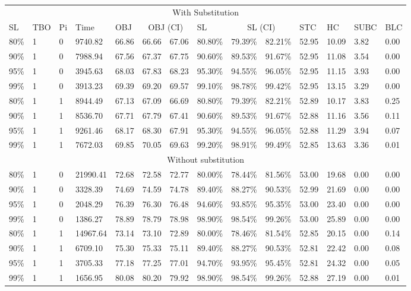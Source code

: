 \documentclass[10pt]{article}
\begin{document}
\begin{table}[]
\begin{tabular}{llllllllllllll}
\multicolumn{14}{c}{With Substitution} \\
SL & TBO & Pi & Time & OBJ & \multicolumn{2}{c}{OBJ (CI)} & SL & \multicolumn{2}{c}{SL (CI)} & STC & HC & SUBC & BLC \\
80\% & 1 & 0 & 9740.82 & 66.86 & 66.66 & 67.06 & 80.80\% & 79.39\% & 82.21\% & 52.95 & 10.09 & 3.82 & 0.00 \\
90\% & 1 & 0 & 7988.94 & 67.56 & 67.37 & 67.75 & 90.60\% & 89.53\% & 91.67\% & 52.95 & 11.08 & 3.54 & 0.00 \\
95\% & 1 & 0 & 3945.63 & 68.03 & 67.83 & 68.23 & 95.30\% & 94.55\% & 96.05\% & 52.95 & 11.15 & 3.93 & 0.00 \\
99\% & 1 & 0 & 3913.23 & 69.39 & 69.20 & 69.57 & 99.10\% & 98.78\% & 99.42\% & 52.95 & 13.15 & 3.29 & 0.00 \\
80\% & 1 & 1 & 8944.49 & 67.13 & 67.09 & 66.69 & 80.80\% & 79.39\% & 82.21\% & 52.89 & 10.17 & 3.83 & 0.25 \\
90\% & 1 & 1 & 8536.70 & 67.71 & 67.79 & 67.41 & 90.60\% & 89.53\% & 91.67\% & 52.88 & 11.16 & 3.56 & 0.11 \\
95\% & 1 & 1 & 9261.46 & 68.17 & 68.30 & 67.91 & 95.30\% & 94.55\% & 96.05\% & 52.88 & 11.29 & 3.94 & 0.07 \\
99\% & 1 & 1 & 7672.03 & 69.85 & 70.05 & 69.63 & 99.20\% & 98.91\% & 99.49\% & 52.85 & 13.63 & 3.36 & 0.01 \\
\multicolumn{14}{c}{Without substitution} \\
80\% & 1 & 0 & 21990.41 & 72.68 & 72.58 & 72.77 & 80.00\% & 78.44\% & 81.56\% & 53.00 & 19.68 & 0.00 & 0.00 \\
90\% & 1 & 0 & 3328.39 & 74.69 & 74.59 & 74.78 & 89.40\% & 88.27\% & 90.53\% & 52.99 & 21.69 & 0.00 & 0.00 \\
95\% & 1 & 0 & 2048.29 & 76.39 & 76.30 & 76.48 & 94.60\% & 93.85\% & 95.35\% & 53.00 & 23.40 & 0.00 & 0.00 \\
99\% & 1 & 0 & 1386.27 & 78.89 & 78.79 & 78.98 & 98.90\% & 98.54\% & 99.26\% & 53.00 & 25.89 & 0.00 & 0.00 \\
80\% & 1 & 1 & 14967.64 & 73.14 & 73.10 & 72.89 & 80.00\% & 78.46\% & 81.54\% & 52.85 & 20.15 & 0.00 & 0.14 \\
90\% & 1 & 1 & 6709.10 & 75.30 & 75.33 & 75.11 & 89.40\% & 88.27\% & 90.53\% & 52.81 & 22.42 & 0.00 & 0.08 \\
95\% & 1 & 1 & 3705.33 & 77.18 & 77.25 & 77.01 & 94.70\% & 93.95\% & 95.45\% & 52.81 & 24.32 & 0.00 & 0.05 \\
99\% & 1 & 1 & 1656.95 & 80.08 & 80.20 & 79.92 & 98.90\% & 98.54\% & 99.26\% & 52.88 & 27.19 & 0.00 & 0.01
\end{tabular}
\end{table}
\end{document}
